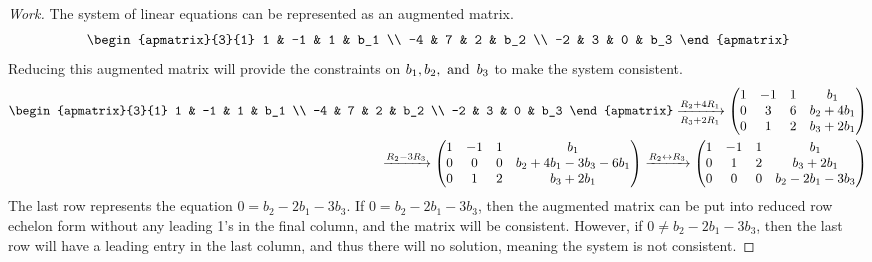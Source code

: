 \documentclass{article}
\begin{document}
\begin{proof}[Work]
    The system of linear equations can be represented as an augmented matrix.
    \[
        \begin{apmatrix}{3}{1}
            1  & -1 & 1 & b_1 \\
            -4 & 7  & 2 & b_2 \\
            -2 & 3  & 0 & b_3
        \end{apmatrix}
    \]
    Reducing this augmented matrix will provide the constraints on $b_1,b_2,\operatorname{~\text{and}~} b_3$ to make the system consistent.
    \begin{align*}
        \begin{apmatrix}{3}{1}
            1  & -1 & 1 & b_1 \\
            -4 & 7  & 2 & b_2 \\
            -2 & 3  & 0 & b_3
        \end{apmatrix} \xrightarrow[R_3 + 2R_1]{R_2 + 4R_1}
        \begin{pmatrix}
            1 & -1 & 1 & b_1        \\
            0 & 3  & 6 & b_2 + 4b_1 \\
            0 & 1  & 2 & b_3 + 2b_1
        \end{pmatrix} \\
        \xrightarrow{R_2 - 3R_3}
        \begin{pmatrix}
            1 & -1 & 1 & b_1                    \\
            0 & 0  & 0 & b_2 + 4b_1 -3b_3 -6b_1 \\
            0 & 1  & 2 & b_3 + 2b_1
        \end{pmatrix} \xrightarrow{R_2 \leftrightarrow R_3}
        \begin{pmatrix}
            1 & -1 & 1 & b_1               \\
            0 & 1  & 2 & b_3 + 2b_1        \\
            0 & 0  & 0 & b_2 - 2b_1 - 3b_3
        \end{pmatrix}
    \end{align*}
    The last row represents the equation $0 = b_2 - 2b_1 - 3b_3$. If $0 = b_2 - 2b_1 - 3b_3$, then the augmented matrix can be put into reduced row echelon form without any leading 1's in the final column, and the matrix will be consistent. However, if $0 \neq b_2 - 2b_1 - 3b_3$, then the last row will have a leading entry in the last column, and thus there will no solution, meaning the system is not consistent.
\end{proof}
\qdash
\end{document}
